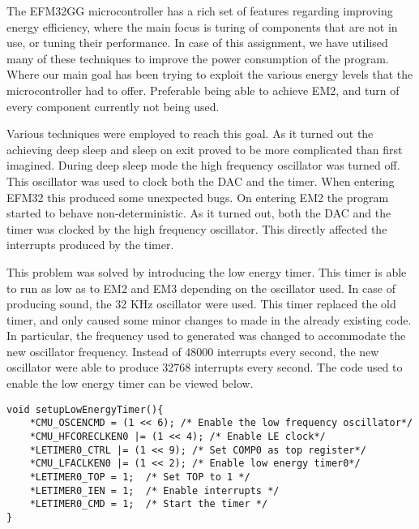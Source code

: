 The EFM32GG microcontroller has a rich set of features regarding improving energy efficiency, where the main focus is turing of components that are not in use, or tuning their performance. In case of this assignment, we have utilised many of these techniques to improve the power consumption of the program. Where our main goal has been trying to exploit the various energy levels that the microcontroller had to offer. Preferable being able to achieve EM2, and turn of every component currently not being used. 

Various techniques were employed to reach this goal. As it turned out the achieving deep sleep and sleep on exit proved to be more complicated than first imagined. During deep sleep mode the high frequency oscillator was turned off. This oscillator was used to clock both the DAC and the timer. When entering EFM32 this produced some unexpected bugs. On entering EM2 the program started to behave non-deterministic. As it turned out, both the DAC and the timer was clocked by the high frequency oscillator. This directly affected the interrupts produced by the timer.

This problem was solved by introducing the low energy timer. This timer is able to run as low as to EM2 and EM3 depending on the oscillator used. In case of producing sound, the 32 KHz oscillator were used. This timer replaced the old timer, and only caused some minor changes to made in the already existing code. In particular, the frequency used to generated was changed to accommodate the new oscillator frequency. Instead of 48000 interrupts every second, the new oscillator were able to produce 32768 interrupts every second. The code used to enable the low energy timer can be viewed below.  


\begin{lstlisting}
void setupLowEnergyTimer(){
    *CMU_OSCENCMD = (1 << 6); /* Enable the low frequency oscillator*/
    *CMU_HFCORECLKEN0 |= (1 << 4); /* Enable LE clock*/
    *LETIMER0_CTRL |= (1 << 9); /* Set COMP0 as top register*/
    *CMU_LFACLKEN0 |= (1 << 2); /* Enable low energy timer0*/
    *LETIMER0_TOP = 1;  /* Set TOP to 1 */
    *LETIMER0_IEN = 1;  /* Enable interrupts */ 
    *LETIMER0_CMD = 1;  /* Start the timer */
}

\end{lstlisting}




